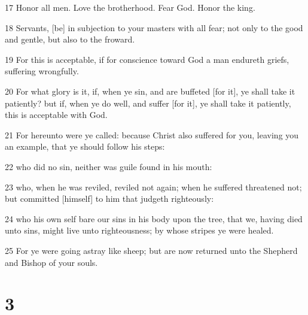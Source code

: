 \par 17 Honor all men. Love the brotherhood. Fear God. Honor the king.
\par 18 Servants, [be] in subjection to your masters with all fear; not only to the good and gentle, but also to the froward.
\par 19 For this is acceptable, if for conscience toward God a man endureth griefs, suffering wrongfully.
\par 20 For what glory is it, if, when ye sin, and are buffeted [for it], ye shall take it patiently? but if, when ye do well, and suffer [for it], ye shall take it patiently, this is acceptable with God.
\par 21 For hereunto were ye called: because Christ also suffered for you, leaving you an example, that ye should follow his steps:
\par 22 who did no sin, neither was guile found in his mouth:
\par 23 who, when he was reviled, reviled not again; when he suffered threatened not; but committed [himself] to him that judgeth righteously:
\par 24 who his own self bare our sins in his body upon the tree, that we, having died unto sins, might live unto righteousness; by whose stripes ye were healed.
\par 25 For ye were going astray like sheep; but are now returned unto the Shepherd and Bishop of your souls.

\chapter{3}

